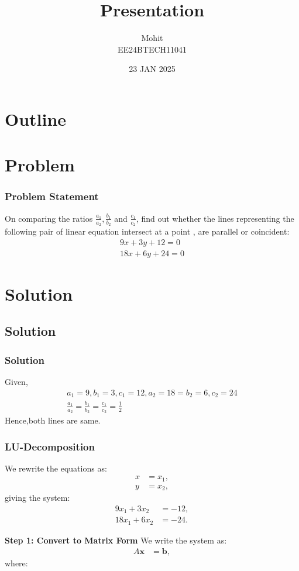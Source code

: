 \documentclass{beamer}
\title{Presentation}
\author{Mohit \\ EE24BTECH11041}
\date{23 JAN 2025}
\theoremstyle{remark}
\numberwithin{equation}{section}
\begin{document}
\begin{frame}
\titlepage
\end{frame}

\section*{Outline}
\begin{frame}
\tableofcontents
\end{frame}
\section{Problem}
\begin{frame}
\frametitle{Problem Statement}
%
On comparing the ratios $\frac{a_1}{a_2},\frac{b_1}{b_2}$ and $\frac{c_1}{c_2}$, find out whether the lines representing the following pair of linear equation intersect at a point , are parallel or coincident:\\
\begin{align}
9x + 3y + 12 = 0 \\
18x + 6y + 24 = 0
\end{align}
\end{frame}

\section{Solution}
\subsection{Solution}
\begin{frame}
\frametitle{Solution}


Given,
\begin{align}
a_1=9,b_1=3,c_1=12,a_2=18=b_2=6,c_2=24 \\
\frac{a_1}{a_2}=\frac{b_1}{b_2}=\frac{c_1}{c_2}=\frac{1}{2}
\end{align}
Hence,both lines are same.
    \end{frame}
    

\begin{frame}
\frametitle{LU-Decomposition}

	We rewrite the equations as:
	\begin{align}
		x &= x_1, \\
		y &= x_2,
	\end{align}
	giving the system:
	\begin{align}
		9x_1 + 3x_2 &= -12, \\
		18x_1 + 6x_2 &= -24.
	\end{align}
	
	\textbf{Step 1: Convert to Matrix Form}
	We write the system as:
	\begin{align}
		A \mathbf{x} &= \mathbf{b},
	\end{align}
	where:

\end{frame}
\end{document}
